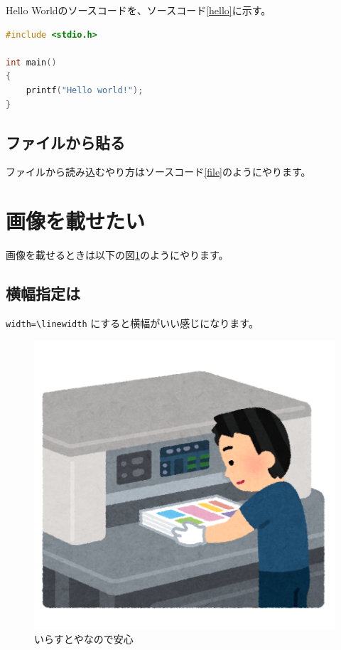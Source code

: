 \documentclass[twocolumn]{jlreq}
\begin{document}
Hello Worldのソースコードを、ソースコード\ref{hello}に示す。

\begin{lstlisting}[language=c,caption=Hello World,label=hello]
#include <stdio.h>

int main()
{
    printf("Hello world!");
}
\end{lstlisting}

\subsection{ファイルから貼る}
ファイルから読み込むやり方はソースコード\ref{file}のようにやります。



\section{画像を載せたい}

画像を載せるときは以下の図\ref{illustya}のようにやります。

\subsection{横幅指定は}

\lstinline{width=\linewidth} にすると横幅がいい感じになります。

\begin{figure}
    \includegraphics[width=\linewidth]{./img/print_seihon_operator_saidan.png}
    \caption{いらすとやなので安心}
    \label{illustya}
\end{figure}

\printbibliography[title=参考文献]
\end{document}
